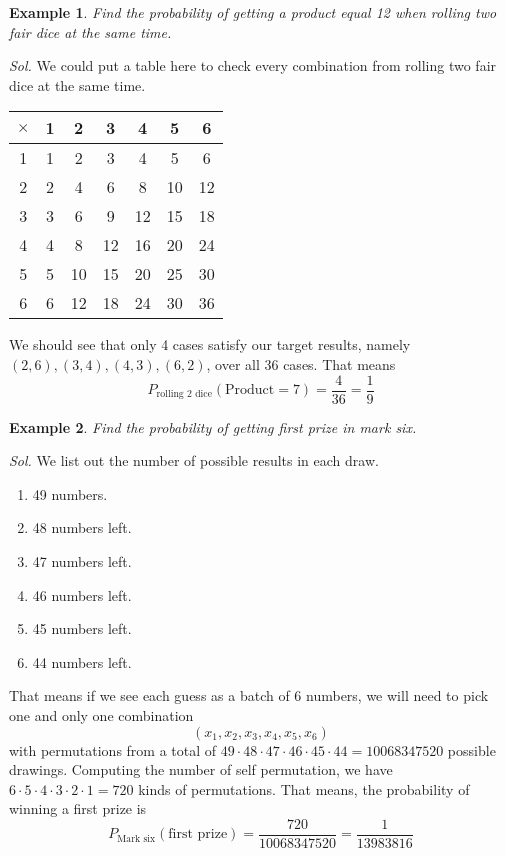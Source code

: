 \documentclass[12pt]{article}
\newtheorem{example}{Example}
\begin{document}
    \begin{example}
        Find the probability of getting a product equal 12 when rolling two fair dice at the same time. 
    \end{example}

    \textit{ Sol.} We could put a table here to check every combination from rolling two fair dice at the same time.
    \begin{center}
        \begin{tabular}{c||c|c|c|c|c|c}
            $\times$&1&2&3&4&5&6\\
            \hline
            \hline
            1&1&2&3&4&5&6\\
            \hline
            2&2&4&6&8&10&12\\
            \hline
            3&3&6&9&12&15&18\\
            \hline
            4&4&8&12&16&20&24\\
            \hline
            5&5&10&15&20&25&30\\
            \hline
            6&6&12&18&24&30&36\\
        \end{tabular}
    \end{center} 
    We should see that only 4 cases satisfy our target results, namely $(2,6),(3,4),(4,3),(6,2)$, over all 36 cases. That means $$P_{\textrm{rolling 2 dice}}(\textrm{Product}=7)=\frac{4}{36}=\frac{1}{9}$$

    \begin{example}
        Find the probability of getting first prize in mark six.
    \end{example}

    \textit{ Sol.} We list out the number of possible results in each draw.\begin{enumerate}
        \item 49 numbers.
        \item 48 numbers left.
        \item 47 numbers left.
        \item 46 numbers left.
        \item 45 numbers left.
        \item 44 numbers left.
    \end{enumerate}
    That means if we see each guess as a batch of 6 numbers, we will need to pick one and only one combination $$(x_1,x_2,x_3,x_4,x_5,x_6)$$
    with permutations from a total of $49\cdot48\cdot47\cdot46\cdot45\cdot44=10068347520$ possible drawings. Computing the number of self permutation, we have $6\cdot5\cdot4\cdot3\cdot2\cdot1=720$ kinds of permutations. That means, the probability of winning a first prize is $$P_{\textrm{Mark six}}(\textrm{first prize})=\frac{720}{10068347520}=\frac{1}{13983816}$$
\end{document}
